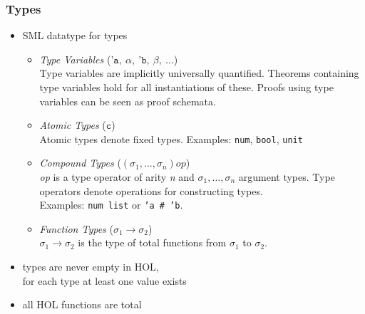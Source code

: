 \begin{frame}
\frametitle{Types}
\begin{itemize}
\item SML datatype for types
\begin{itemize}
\item \emph{Type Variables} ($\texttt{'a},\ \alpha,\ \texttt{'b},\ \beta,\ \ldots$)\\
Type variables are implicitly universally quantified. Theorems containing type variables
hold for all instantiations of these. Proofs using type variables can be seen as proof schemata.
\item \emph{Atomic Types} ($\texttt{c}$)\\
Atomic types denote fixed types. Examples: \texttt{num}, \texttt{bool}, \texttt{unit}
\item \emph{Compound Types} ($(\sigma_1, \ldots, \sigma_n) \textit{op}$)\\
\textit{op} is a \alert{type operator} of arity \textit{n} and $\sigma_1, \ldots, \sigma_n$ \alert{argument types}. Type operators denote operations for constructing types.\\
Examples: \texttt{num list} or \texttt{'a \# 'b}.
\item \emph{Function Types} ($\sigma_1 \to \sigma_2$)\\
$\sigma_1 \to \sigma_2$ is the type of \alert{total} functions from $\sigma_1$ to $\sigma_2$. 
\end{itemize}
\item types are never empty in HOL, \ie\\
for each type at least one value exists
\item all HOL functions are total
\end{itemize}
\end{frame}



